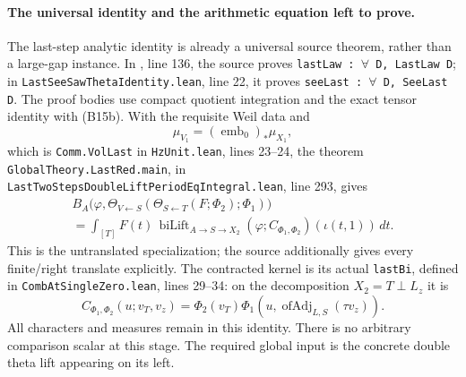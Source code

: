 \documentclass[11pt]{article}
\theoremstyle{definition}\newtheorem{definition}[theorem]{Definition}\newtheorem{remark}[theorem]{Remark}
\begin{document}
\paragraph{The universal identity and the arithmetic equation left to prove.}
The last-step analytic identity is already a universal source theorem, rather than a large-gap instance. In , line 136, the source proves \texttt{lastLaw : \ensuremath{\forall} D, LastLaw D}; in \nolinkurl{LastSeeSawThetaIdentity.lean}, line 22, it proves \texttt{seeLast : \ensuremath{\forall} D, SeeLast D}. The proof bodies use compact quotient integration and the exact tensor identity with (B15b). With the requisite Weil data and
\[
 \mu_{V_1}=(\operatorname{emb}_0)_*\mu_{X_1},
 \tag{B15k}
\]
which is \texttt{Comm.VolLast} in \texttt{HzUnit.lean}, lines 23--24, the theorem \nolinkurl{GlobalTheory.LastRed.main}, in \nolinkurl{LastTwoStepsDoubleLiftPeriodEqIntegral.lean}, line 293, gives
\begin{equation}
\begin{gathered}
 B_A\bigl(\varphi,
   \Theta_{V\leftarrow S}(\Theta_{S\leftarrow T}(F;\Phi_2);\Phi_1)\bigr)
 \\
  =\int_{[T]} F(t)\,
       \operatorname{biLift}_{A\to S\to X_2}
       (\varphi;C_{\Phi_1,\Phi_2})(\iota(t,1))\,dt.
\end{gathered}
 \tag{B15l}
\end{equation}
This is the untranslated specialization; the source additionally gives every finite/right translate explicitly. The contracted kernel is its actual \texttt{lastBi}, defined in \texttt{CombAtSingleZero.lean}, lines 29--34: on the decomposition $X_2=T\perp L_z$ it is
\[
 C_{\Phi_1,\Phi_2}(u;v_T,v_z)
       =\Phi_2(v_T)\Phi_1(u,\operatorname{ofAdj}_{L,S}(\tau v_z)).
\]
All characters and measures remain in this identity. There is no arbitrary comparison scalar at this stage. The required global input is the concrete double theta lift appearing on its left.
\end{document}
